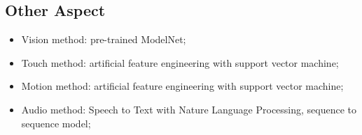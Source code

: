 \subsection{Other Aspect}
\label{subsec:other-model}


\begin{itemize}
  \item Vision method: pre-trained ModelNet;
  \item Touch method: artificial feature engineering with support vector machine;
  \item Motion method: artificial feature engineering with support vector machine;
  \item Audio method: Speech to Text with Nature Language Processing, sequence to sequence model;
\end{itemize}